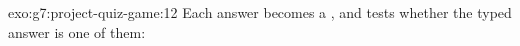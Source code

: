 \begin{solution}{exo:g7:project-quiz-game:12}
Each answer becomes a , and  tests whether the typed answer is one
of them:

\label{lst:g7:project-quiz-game:sol-many}
\end{solution}
